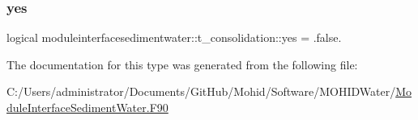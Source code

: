 \mbox{\label{structmoduleinterfacesedimentwater_1_1t__consolidation_a979a6deccc3aa1a1c0c18a31dc7b5b2d}} 
\subsubsection{\texorpdfstring{yes}{yes}}
{\footnotesize\ttfamily logical moduleinterfacesedimentwater\+::t\+\_\+consolidation\+::yes = .false.\hspace{0.3cm}{\ttfamily [private]}}



The documentation for this type was generated from the following file\+:\begin{DoxyCompactItemize}
\item 
C\+:/\+Users/administrator/\+Documents/\+Git\+Hub/\+Mohid/\+Software/\+M\+O\+H\+I\+D\+Water/\mbox{\hyperlink{_module_interface_sediment_water_8_f90}{Module\+Interface\+Sediment\+Water.\+F90}}\end{DoxyCompactItemize}
